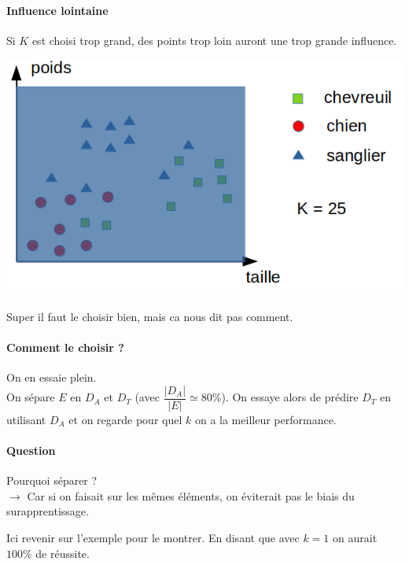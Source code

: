 \paragraph{Influence lointaine} Si $K$ est choisi trop grand, des points trop loin auront une trop grande influence.
\begin{center}
	\includegraphics[scale=0.4]{Developpements/k voisins/graphe3.png}	
\end{center}

\begin{com}
	Super il faut le choisir bien, mais ca nous dit pas comment. 
\end{com}

\paragraph{Comment le choisir ?} On en essaie plein.\\
On sépare $E$ en $D_A$ et $D_T$ (avec $\dfrac{\left| D_A \right|}{|E|} \simeq 80\%$). On essaye alors de prédire $D_T$ en utilisant $D_A$ et on regarde pour quel $k$ on a la meilleur performance.

\paragraph{Question} Pourquoi séparer ?\\
$\to$ Car si on faisait sur les mêmes éléments, on éviterait pas le biais du surapprentissage.
\begin{com}
	Ici revenir sur l'exemple pour le montrer. En disant que avec $k =1$ on aurait $100\%$ de réussite.
\end{com}

